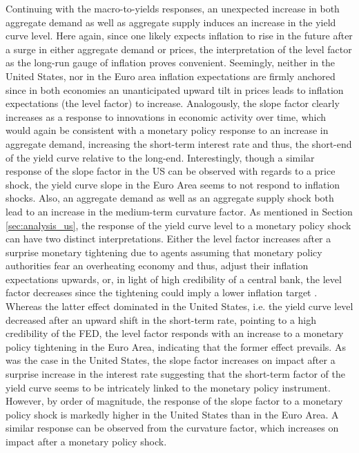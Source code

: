 Continuing with the macro-to-yields responses, an unexpected increase in both aggregate demand as well as aggregate supply induces an increase in the yield curve level. 
Here again, since one likely expects inflation to rise in the future after a surge in either aggregate demand or prices, the interpretation of the level factor as the long-run gauge of inflation proves convenient.
Seemingly, neither in the United States, nor in the Euro area inflation expectations are firmly anchored since in both economies an unanticipated upward tilt in prices leads to inflation expectations (the level factor) to increase.
Analogously, the slope factor clearly increases as a response to innovations in economic activity over time, which would again be consistent with a monetary policy response to an increase in aggregate demand, increasing the short-term interest rate and thus, the short-end of the yield curve relative to the long-end. 
Interestingly, though a similar response of the slope factor in the US can be observed with regards to a price shock, the yield curve slope in the Euro Area seems to not respond to inflation shocks. 
Also, an aggregate demand as well as an aggregate supply shock both lead to an increase in the medium-term curvature factor. 
As mentioned in Section \ref{sec:analysis_us}, the response of the yield curve level to a monetary policy shock can have two distinct interpretations.
Either the level factor increases after a surprise monetary tightening due to agents assuming that monetary policy authorities fear an overheating economy and thus, adjust their inflation expectations upwards, or, in light of high credibility of a central bank, the level factor decreases since the tightening could imply a lower inflation target \citep{diebold2006macroeconomy}. 
Whereas the latter effect dominated in the United States, i.e. the yield curve level decreased after an upward shift in the short-term rate, pointing to a high credibility of the FED, the level factor responds with an increase to a monetary policy tightening in the Euro Area, indicating that the former effect prevails. 
As was the case in the United States, the slope factor increases on impact after a surprise increase in the interest rate suggesting that the short-term factor of the yield curve seems to be intricately linked to the monetary policy instrument.
However, by order of magnitude, the response of the slope factor to a monetary policy shock is markedly higher in the United States than in the Euro Area. A similar response can be observed from the curvature factor, which increases on impact after a monetary policy shock. 

